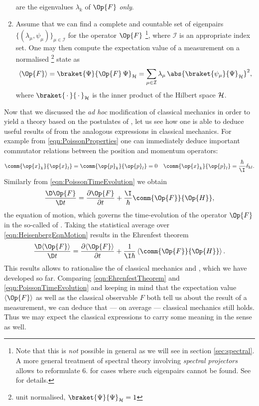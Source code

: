 \begin{enumerate}
		are the eigenvalues $\lambda_k$ of $\Op{F}$ \emph{only}.
	\item Assume that we can find a complete and countable
		set of eigenpairs $\{ (\lambda_\mu, \psi_\mu) \}_{\mu \in \mathcal{I}}$
		for the operator $\Op{F}$%
		\footnote{Note that this is \emph{not} possible in general
		as we will see in section \vref{sec:spectral}.
		A more general treatment of spectral theory involving
		\textit{spectral projectors} allows to reformulate 6. for cases
		where such eigenpairs cannot be found.
		See \cite{Helffer2013} for details.},
		where $\mathcal{I}$ is an appropriate index set.
		One may then compute the expectation value of a measurement
		on a normalised%
		\footnote{unit normalised, \ie $\braket{\Psi}{\Psi}_\hilbert = 1$}
		state as
		\begin{equation}
			\langle \Op{F} \rangle
				= \braket{\Psi}{\Op{F} \, \Psi}_\hilbert
				= \sum_{\mu\in\mathcal{I}} \lambda_\mu \,
							\abs{\braket{\psi_\mu}{\Psi}_\hilbert}^2,
			\label{eqn:QMExpectation}
		\end{equation}
		where $\braket{\slot}{\slot}_\hilbert$ is the inner product
		of the Hilbert space $\mathcal{H}$.
\end{enumerate}
Now that we discussed the \textit{ad hoc} modification of classical mechanics
in order to yield a theory based on the postulates of \QM,
let us see how one is able to deduce useful results of \QM
from the analogous expressions in classical mechanics.
For example from \eqref{eqn:PoissonProperties} one can immediately
deduce important commutator relations between the position and momentum operators:
\begin{align}
	\comm{\op{x}_k}{\op{x}_l} &= \comm{\op{p}_k}{\op{p}_l} = 0 & \comm{\op{x}_k}{\op{p}_l} = \frac{\hbar}{\I} \delta_{kl}.
	\label{eqn:compatibilityOperator}
\end{align}
Similarly from \eqref{eqn:PoissonTimeEvolution} we obtain
\begin{equation}
	\frac{\D \Op{F}}{\D t} = \frac{\partial \Op{F}}{\partial t} + \frac{\I}{\hbar} \comm{\Op{F}}{\Op{H}},
	\label{eqn:HeisenbergEqnMotion}
\end{equation}
the equation of motion, which governs the time-evolution of the operator $\Op{F}$
in the so-called  of \QM.
Taking the statistical average over \eqref{eqn:HeisenbergEqnMotion}
results in the Ehrenfest theorem
\begin{equation}
	\frac{\D \langle \Op{F} \rangle}{\D t} = \frac{\partial \langle \Op{F} \rangle}{\partial t} + \frac{1}{\I \hbar} \left\langle \comm{\Op{F}}{\Op{H}} \right\rangle.
	\label{eqn:EhrenfestTheorem}
\end{equation}
This results allows to rationalise the 
of classical mechanics and \QM,
which we have developed so far.
Comparing \eqref{eqn:EhrenfestTheorem} and \eqref{eqn:PoissonTimeEvolution}
and keeping in mind that the expectation value $\langle \Op{F} \rangle$
as well as the classical observable $F$ both tell us about the result
of a measurement,
we can deduce that --- on average --- classical mechanics still holds.
Thus we may expect the classical expressions to carry some meaning
in the \QM sense as well.

